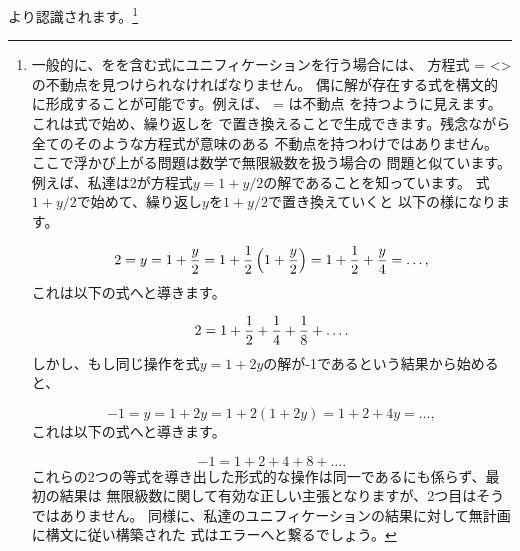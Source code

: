 より認識されます。\footnote{
一般的に、をを含む式にユニフィケーションを行う場合には、
方程式 = <>の不動点を見つけられなければなりません。
偶に解が存在する式を構文的に形成することが可能です。例えば、 = は不動点
を持つように見えます。これは式で始め、繰り返しを
で置き換えることで生成できます。残念ながら全てのそのような方程式が意味のある
不動点を持つわけではありません。ここで浮かび上がる問題は数学で無限級数を扱う場合の
問題と似ています。例えば、私達は2が方程式\( y = 1 + y / 2 \)の解であることを知っています。
式\( 1 + y / 2 \)で始めて、繰り返し\( y \)を\( 1 + y / 2 \)で置き換えていくと
以下の様になります。
\begin{comment}
\begin{example}
2 = y = 1 + y/2 = 1 + (1 + y/2)/2 = 1 + 1/2 + y/4 = ...
\end{example}
\end{comment}
\begin{displaymath}
 2 = y = 1 + {y \over 2} = 1 + {1\over2}\left(1 + {y \over 2}\right) = 
	1 + {1\over2} + {y \over 4} = \dots , 
\end{displaymath}
\noindent
これは以下の式へと導きます。
\begin{comment}

\begin{example}
2 = 1 + 1/2 + 1/4 + 1/8 + ...
\end{example}

\end{comment}
\begin{displaymath}
 2 = 1 + {1\over2} + {1\over4} + {1\over8} + \dots. 
\end{displaymath}
\noindent
しかし、もし同じ操作を式\( y = 1 + 2y \)の解が-1であるという結果から始めると、
\begin{comment}

\begin{example}
-1 = y = 1 + 2y = 1 + 2(1 + 2y) = 1 + 2 + 4y = ...
\end{example}

\end{comment}
\begin{displaymath}
 -1 = y = 1 + 2y = 1 + 2(1 + 2y) = 1 + 2 + 4y = \dots, 
\end{displaymath}
\noindent
これは以下の式へと導きます。
\begin{comment}

\begin{example}
-1 = 1 + 2 + 4 + 8 + ...
\end{example}

\end{comment}
\begin{displaymath}
 -1 = 1 + 2 + 4 + 8 + \dots. 
\end{displaymath}
\noindent
これらの2つの等式を導き出した形式的な操作は同一であるにも係らず、最初の結果は
無限級数に関して有効な正しい主張となりますが、2つ目はそうではありません。
同様に、私達のユニフィケーションの結果に対して無計画に構文に従い構築された
式はエラーへと繋るでしょう。
}


